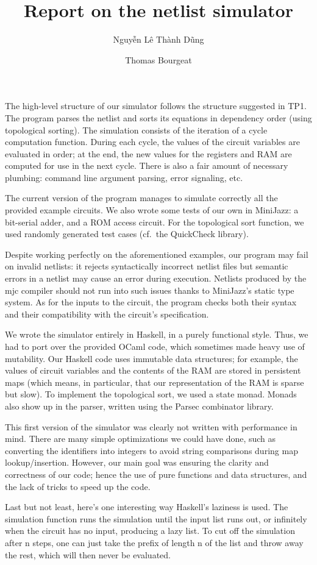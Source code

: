 \documentclass[a4paper, 11pt]{article}
\begin{document}
\title{Report on the netlist simulator}
\author{Nguyễn Lê Thành Dũng \and Thomas Bourgeat}
\maketitle



The high-level structure of our simulator follows the structure suggested in TP1. The program parses the netlist and sorts its equations in dependency order (using topological sorting). The simulation consists of the iteration of a cycle computation function. During each cycle, the values of the circuit variables are evaluated in order; at the end, the new values for the registers and RAM are computed for use in the next cycle. There is also a fair amount of necessary plumbing: command line argument parsing, error signaling, etc.

The current version of the program manages to simulate correctly all the provided example circuits. We also wrote some tests of our own in MiniJazz: a bit-serial adder, and a ROM access circuit. For the topological sort function, we used randomly generated test cases (cf.\ the QuickCheck library).

Despite working perfectly on the aforementioned examples, our program may fail on invalid netlists: it rejects syntactically incorrect netlist files but semantic errors in a netlist may cause an error during execution. Netlists produced by the mjc compiler should not run into such issues thanks to MiniJazz's static type system. As for the inputs to the circuit, the program checks both their syntax and their compatibility with the circuit's specification.

We wrote the simulator entirely in Haskell, in a purely functional style. Thus, we had to port over the provided OCaml code, which sometimes made heavy use of mutability. Our Haskell code uses immutable data structures; for example, the values of circuit variables and the contents of the RAM are stored in persistent maps (which means, in particular, that our representation of the RAM is sparse but slow). To implement the topological sort, we used a state monad. Monads also show up in the parser, written using the Parsec combinator library.

This first version of the simulator was clearly not written with performance in mind. There are many simple optimizations we could have done, such as converting the identifiers into integers to avoid string comparisons during map lookup/insertion. However, our main goal was ensuring the clarity and correctness of our code; hence the use of pure functions and data structures, and the lack of tricks to speed up the code. 

Last but not least, here's one interesting way Haskell's laziness is used. The simulation function runs the simulation until the input list runs out, or infinitely when the circuit has no input, producing a lazy list. To cut off the simulation after n steps, one can just take the prefix of length n of the list and throw away the rest, which will then never be evaluated.
\end{document}
